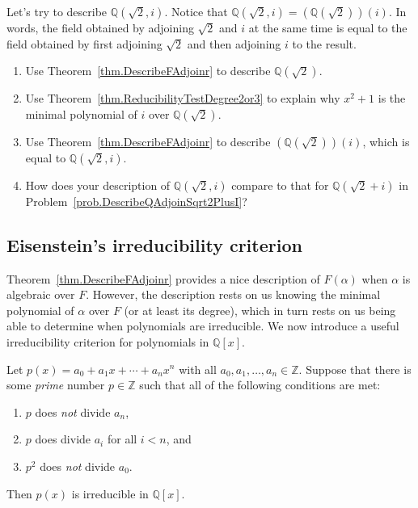 \begin{problem}\label{prob.DescribeQAdjoinRoot2Andi}
Let's try to describe $\mathbb{Q}(\sqrt{2},i)$. Notice that $\mathbb{Q}(\sqrt{2},i) = \left(\mathbb{Q}(\sqrt{2})\right)(i)$. In words, the field obtained by adjoining $\sqrt{2} $ and $i$ at the same time is equal to the field obtained by first adjoining $\sqrt{2}$ and then adjoining $i$ to the result.
\begin{enumerate}
\item Use  Theorem~\ref{thm.DescribeFAdjoinr} to describe $\mathbb{Q}(\sqrt{2})$.
\item Use Theorem~\ref{thm.ReducibilityTestDegree2or3} to explain why $x^2+1$ is the minimal polynomial of $i$ over $\mathbb{Q}(\sqrt{2})$.
\item Use  Theorem~\ref{thm.DescribeFAdjoinr} to describe $\left(\mathbb{Q}(\sqrt{2})\right)(i)$, which is equal to $\mathbb{Q}(\sqrt{2},i)$.
\item How does your description of $\mathbb{Q}(\sqrt{2},i)$ compare to that for $\mathbb{Q}(\sqrt{2} + i)$ in Problem~\ref{prob.DescribeQAdjoinSqrt2PlusI}?
\end{enumerate}
\end{problem}


\subsection{Eisenstein's irreducibility criterion}

Theorem~\ref{thm.DescribeFAdjoinr} provides a nice description of $F(\alpha)$ when $\alpha$ is algebraic over $F$. However, the description rests on us knowing the minimal polynomial of $\alpha$ over $F$ (or at least its degree), which in turn rests on us being able to determine when polynomials are irreducible. We now introduce a useful irreducibility criterion for polynomials in $\mathbb{Q}[x]$.

\begin{fact}\label{fact.Eisenstein}
Let $p(x) = a_0 + a_1x + \cdots + a_nx^n$ with all $a_0,a_1,\ldots,a_n \in \mathbb{Z}$. Suppose that there is some \emph{prime} number $p \in \mathbb{Z}$ such that all of the following conditions are met:
\begin{enumerate}
\item $p$ does \emph{not} divide $a_n$,
\item $p$ does divide $a_i$ for all $i<n$, and
\item $p^2$ does \emph{not} divide $a_0$.
\end{enumerate}
Then $p(x)$ is irreducible in $\mathbb{Q}[x]$.
\end{fact}

